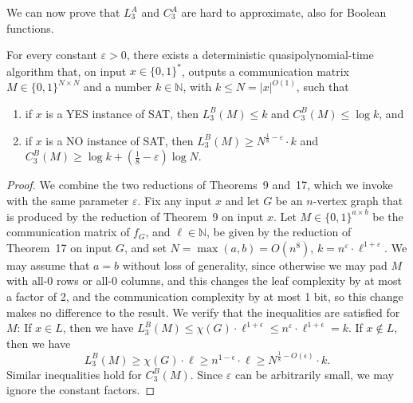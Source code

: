 We can now prove that $L_3^A$ and $C_3^A$ are hard to approximate, also for Boolean functions.
\begin{theorem}\label{thm:three-round-hardness}
For every constant $\varepsilon>0$, there exists a deterministic quasipolynomial-time algorithm that, on input $x\in\{0,1\}^*$, outputs a communication matrix $M\in\{0,1\}^{N\times N}$ and a number $k\in\mathbb N$, with $k\le N=|x|^{O(1)}$, such that
\begin{enumerate}
\item if $x$ is a YES instance of SAT, then $L_3^B(M)\le k$ and $C_3^B(M)\le\log k$, and
\item if $x$ is a NO instance of SAT, then $L_3^B(M)\ge N^{\frac18-\varepsilon}\cdot k$ and $C_3^B(M)\ge\log k+(\frac18-\varepsilon)\log N$.
\end{enumerate}
\end{theorem}
\begin{proof}
We combine the two reductions of Theorems~9 and~17, which we invoke with the same parameter $\varepsilon$. Fix any input $x$ and let $G$ be an $n$-vertex graph that is produced by the reduction of Theorem~9 on input $x$. Let $M\in\{0,1\}^{a\times b}$ be the communication matrix of $f_G$, and $\ell\in\mathbb N$, be given by the reduction of Theorem~17 on input $G$, and set $N=\max(a,b)=O(n^8)$, $k=n^\varepsilon\cdot\ell^{1+\varepsilon}$. We may assume that $a=b$ without loss of generality, since otherwise we may pad $M$ with all-0 rows or all-0 columns, and this changes the leaf complexity by at most a factor of 2, and the communication complexity by at most 1 bit, so this change makes no difference to the result.
We verify that the inequalities are satisfied for $M$: If $x\in L$, then we have $L_3^B(M)\le\chi(G)\cdot\ell^{1+\epsilon}\le n^\varepsilon\cdot\ell^{1+\epsilon}=k$. If $x\notin L$, then we have
\[L_3^B(M)\ge\chi(G)\cdot\ell\ge n^{1-\epsilon}\cdot\ell\ge N^{\frac18-O(\epsilon)}\cdot k.\]
Similar inequalities hold for $C_3^B(M)$. Since $\varepsilon$ can be arbitrarily small, we may ignore the constant factors.
\end{proof}
